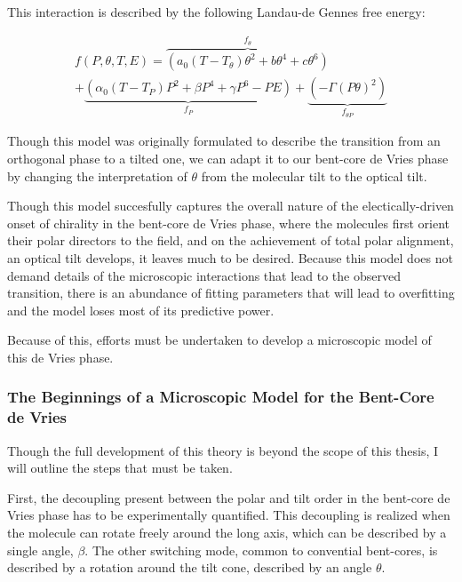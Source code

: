 \documentclass[aagreenthesis]{subfiles}
\begin{document}
This interaction is described by the following Landau-de Gennes free energy:

\begin{multline}
    f(P,\theta,T,E) = \overbrace{\left(a_0(T-T_\theta)\theta^2+b\theta^4+c\theta^6
    \right)}^{f_\theta}\\
    + \underbrace{\left( \alpha_0(T-T_P)P^2+\beta P^4 + \gamma P^6 -PE
            \right)}_{f_P} +\underbrace{\left(
    -\Gamma (P \theta)^2 \right)}_{f_{\theta P}}
\end{multline}

Though this model was originally formulated to describe the transition from an
orthogonal phase to a tilted one, we can adapt it to our bent-core de Vries
phase by changing the interpretation of $\theta$ from the molecular tilt to the
optical tilt.

Though this model succesfully captures the overall nature of the
electically-driven onset of chirality in the bent-core de Vries phase, where the
molecules first orient their polar directors to the field, and on the
achievement of total polar alignment, an optical tilt develops, it leaves much
to be desired. Because this model does not demand details of the
microscopic interactions that lead to the observed transition, there is an abundance of
fitting parameters that will lead to overfitting and the model loses most of its
predictive power.

Because of this, efforts must be undertaken to develop a microscopic model of
this de Vries phase. 


\subsubsection{The Beginnings of a Microscopic Model for the Bent-Core de Vries}

Though the full development of this theory is beyond the
scope of this thesis, I will outline the steps that must be taken.

First, the decoupling present between the polar and tilt order in the bent-core
de Vries phase has to be experimentally
quantified. This decoupling is realized when the molecule can rotate freely
around the long axis, which can be described by a single angle, $\beta$. The other switching mode, common to convential bent-cores,
is described by a rotation around the tilt cone, described by an angle $\theta$.
\end{document}
